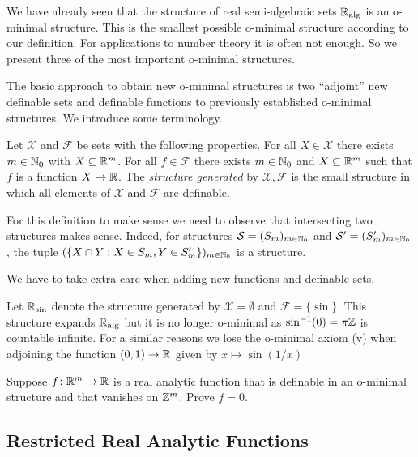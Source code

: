 We have already seen that the structure of real semi-algebraic sets
${\mathbb{R}}_{\mathrm{alg}}$ is an o-minimal structure. This is the smallest possible
o-minimal structure according to our definition. For applications to
number theory it is often not enough. So we present three of the most
important o-minimal structures.


The basic approach to obtain  new o-minimal structures is two
``adjoint'' new definable sets and definable functions to previously
established o-minimal structures.
We introduce some terminology.

\begin{definition}
  Let $\mathscr{X}$ and $\mathscr{F}$ be sets with the following
  properties. For all $X\in \mathscr{X}$ there exists $m\in{\mathbb{N}}_0$ with
  $X\subseteq{\mathbb{R}}^m$. For all $f\in \mathscr{F}$ there exists $m\in{\mathbb{N}}_0$
  and $X\subseteq{\mathbb{R}}^m$ such that $f$ is a function $X\rightarrow{\mathbb{R}}$. The
  \emph{structure generated} by $\mathscr{X},\mathscr{F}$ is the small
  structure in which all elements of $\mathcal{X}$ and $\mathscr{F}$ are
  definable.
\end{definition}

For this definition to make sense we need to observe that intersecting
two structures makes sense. Indeed, for 
structures ${\mathcal S}=(S_m)_{m\in{\mathbb{N}}_0}$ and ${\mathcal S}'=(S'_m)_{m\in{\mathbb{N}}_0}$, the tuple
$(\{X\cap Y : X\in S_m, Y\in S'_m\})_{m\in{\mathbb{N}}_0}$ is a structure.

We have to take extra care when adding new functions and definable
sets. 

\begin{example}
  \label{ex:adjoinsin}
  Let ${\mathbb{R}}_{\sin}$ denote the structure generated by
  $\mathscr{X}=\emptyset$ and $\mathscr{F}=\{\sin \}$.
  This structure expands ${\mathbb{R}}_{\mathrm{alg}}$ but it is no longer o-minimal as
  $\sin^{-1}(0)=\pi{\mathbb{Z}}$ is countable infinite.
  For a similar reasons we lose the o-minimal axiom (v) when adjoining the function
  $(0,1)\rightarrow{\mathbb{R}}$ given by $x\mapsto \sin (1/x)$ 
\end{example}


\begin{exercise}
  \label{exer:periodic}
  Suppose $f\colon {\mathbb{R}}^m\rightarrow{\mathbb{R}}$ is a real analytic function
  that is definable in an o-minimal structure and
  that vanishes on ${\mathbb{Z}}^m$. Prove $f=0$.  
\end{exercise}

\subsection{Restricted Real Analytic Functions}

